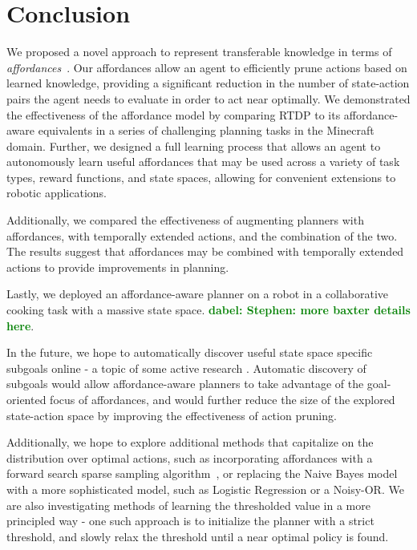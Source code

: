 \documentclass[letterpaper]{article}
\newcommand{\dnote}[1]{\textcolor{Green}{\textbf{dabel:  #1}}}
\begin{document}
\section{Conclusion}
\label{sec:conclusion}
We proposed a novel approach to represent transferable knowledge in terms of
{\em affordances}~\cite{gibson77}. Our affordances allow an agent to efficiently prune actions 
based on learned knowledge, providing a significant reduction in the number of state-action
pairs the agent needs to evaluate in order to act near optimally. We demonstrated the 
effectiveness of the affordance model by comparing RTDP to its affordance-aware
equivalents in a series of challenging planning tasks in the Minecraft domain. Further, we designed
a full learning process that allows an agent to autonomously learn useful affordances that may be used
across a variety of task types, reward functions, and state spaces, allowing for convenient extensions 
to robotic applications.

Additionally, we compared the effectiveness of augmenting planners with affordances, with 
temporally extended actions, and the combination of the two. The results suggest that affordances may be combined with 
temporally extended actions to provide improvements in planning.

Lastly, we deployed an affordance-aware planner on a robot in a collaborative cooking task with a massive 
state space. \dnote{Stephen: more baxter details here}.

In the future, we hope to automatically discover useful state space specific subgoals online 
- a topic of some active research \cite{Mcgovern01automaticdiscovery,Simsek:2005:IUS:1102351.1102454}.
Automatic discovery of subgoals would allow affordance-aware planners to take advantage of the goal-oriented
focus of affordances, and would further reduce the size of the explored state-action space by improving the effectiveness of action pruning. 

Additionally, we hope to explore additional methods that capitalize on the distribution over optimal actions,
such as incorporating affordances with a forward search sparse sampling algorithm~\cite{walsh2010integrating},
or replacing the Naive Bayes model with a more sophisticated model, such as Logistic Regression or a Noisy-OR.
We are also investigating methods of learning the thresholded value in a more principled way - one such
approach is to initialize the planner with a strict threshold, and slowly relax the threshold until a near optimal
policy is found.

{\small


}
\end{document}
